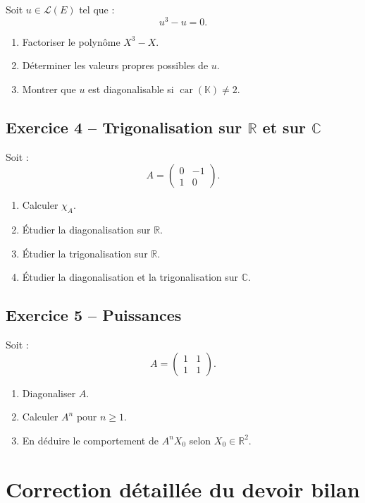 \documentclass[11pt,a4paper]{article}
\newcommand{\K}{\mathbb K}
\newcommand{\R}{\mathbb R}
\newcommand{\C}{\mathbb C}
\newcommand{\Lcal}{\mathcal L}
\begin{document}
Soit \(u\in\Lcal(E)\) tel que :
\[
u^3-u=0.
\]

\begin{enumerate}
    \item Factoriser le polynôme \(X^3-X\).
    \item Déterminer les valeurs propres possibles de \(u\).
    \item Montrer que \(u\) est diagonalisable si \(\operatorname{car}(\K)\neq2\).
\end{enumerate}

\subsection*{Exercice 4 -- Trigonalisation sur \(\R\) et sur \(\C\)}

Soit :
\[
A=
\begin{pmatrix}
0&-1\\
1&0
\end{pmatrix}.
\]

\begin{enumerate}
    \item Calculer \(\chi_A\).
    \item Étudier la diagonalisation sur \(\R\).
    \item Étudier la trigonalisation sur \(\R\).
    \item Étudier la diagonalisation et la trigonalisation sur \(\C\).
\end{enumerate}

\subsection*{Exercice 5 -- Puissances}

Soit :
\[
A=
\begin{pmatrix}
1&1\\
1&1
\end{pmatrix}.
\]

\begin{enumerate}
    \item Diagonaliser \(A\).
    \item Calculer \(A^n\) pour \(n\geq1\).
    \item En déduire le comportement de \(A^nX_0\) selon \(X_0\in\R^2\).
\end{enumerate}

\newpage

\section{Correction détaillée du devoir bilan}
\end{document}
